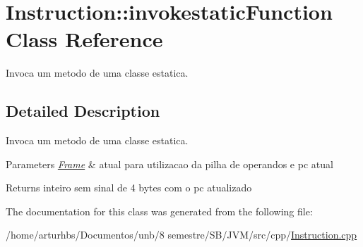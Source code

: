 \hypertarget{classInstruction_1_1invokestaticFunction}{}\section{Instruction\+:\+:invokestatic\+Function Class Reference}
\label{classInstruction_1_1invokestaticFunction}


Invoca um metodo de uma classe estatica.  




\subsection{Detailed Description}
Invoca um metodo de uma classe estatica. 


\begin{DoxyParams}{Parameters}
{\em \hyperlink{classFrame}{Frame}} & atual para utilizacao da pilha de operandos e pc atual \\
\hline
\end{DoxyParams}
\begin{DoxyReturn}{Returns}
inteiro sem sinal de 4 bytes com o pc atualizado 
\end{DoxyReturn}


The documentation for this class was generated from the following file\+:\begin{DoxyCompactItemize}
\item 
/home/arturhbs/\+Documentos/unb/8 semestre/\+S\+B/\+J\+V\+M/src/cpp/\hyperlink{Instruction_8cpp}{Instruction.\+cpp}\end{DoxyCompactItemize}
